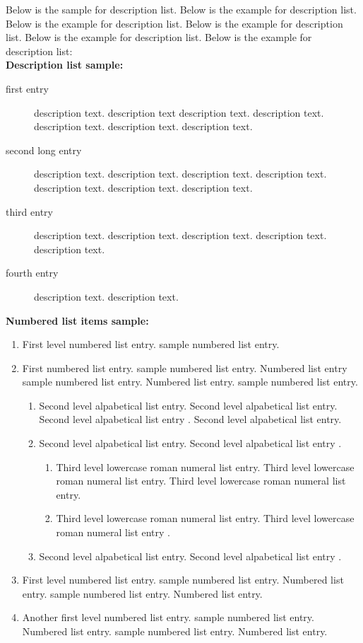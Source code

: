 \documentclass{wber}
\begin{document}
Below is the sample for description list. Below is the example for description list. Below is the example for description list. Below is the example for description list. Below is the example for description list. Below is the example for description list:\\[12pt]


\noindent\textbf{Description list sample:}

\begin{description}
\item[first entry] description text. description text \citep{hanlon-72} description text. description text. description text. description text. description text. 
\item[second long entry] description text. description text. description text. description text. description text. description text. description text. 
\item[third entry] description text. description text. description text. description text. description text. 
\item[fourth entry] description text. description text. 
\end{description}


\noindent\textbf{Numbered list items sample:}

\begin{enumerate}
\item First level numbered list entry. sample numbered list entry. 
\item First numbered list entry. sample numbered list entry. Numbered list entry \citep{bry-afflerbach} sample numbered list entry. Numbered list entry. sample numbered list entry. 
\begin{enumerate}
\item Second level alpabetical list entry. Second level alpabetical list entry. Second level alpabetical list entry \citep{jones-n-h-r}. Second level alpabetical list entry. 
\item Second level alpabetical list entry. Second level alpabetical list entry \citep{jones-s-r}.
\begin{enumerate}
\item Third level lowercase roman numeral list entry. Third level lowercase roman numeral list entry. Third level lowercase roman numeral list entry. 
\item Third level lowercase roman numeral list entry. Third level lowercase roman numeral list entry \citep{jones-65}.
\end{enumerate}
\item Second level alpabetical list entry. Second level alpabetical list entry \citep{jones-69}.
\end{enumerate}
\item First level numbered list entry. sample numbered list entry. Numbered list entry. sample numbered list entry. Numbered list entry. 
\item Another first level numbered list entry. sample numbered list entry. Numbered list entry. sample numbered list entry. Numbered list entry. 
\end{enumerate}%
\end{document}
